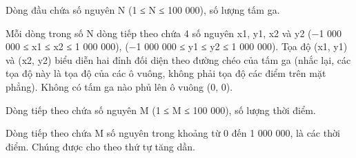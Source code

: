 Dòng đầu chứa số nguyên N (1 ≤ N ≤ 100 000), số lượng tấm ga.  

   Mỗi dòng trong số N dòng tiếp theo chứa 4 số nguyên x1, y1, x2 và y2 (−1 000 000 ≤ x1 ≤ x2 ≤ 1 000 000), (−1 000 000 ≤ y1 ≤ y2 ≤ 1 000 000). Tọa độ (x1, y1) và (x2, y2) biểu diễn hai đỉnh đối diện theo đường chéo của tấm ga (nhắc lại, các tọa độ này là tọa độ của các ô vuông, không phải tọa độ các điểm trên mặt phẳng). Không có tấm ga nào phủ lên ô vuông (0, 0).  

   Dòng tiếp theo chứa số nguyên M (1 ≤ M ≤ 100 000), số lượng thời điểm.  

   Dòng tiếp theo chứa M số nguyên trong khoảng từ 0 đến 1 000 000, là các thời điểm. Chúng được cho theo thứ tự tăng dần.